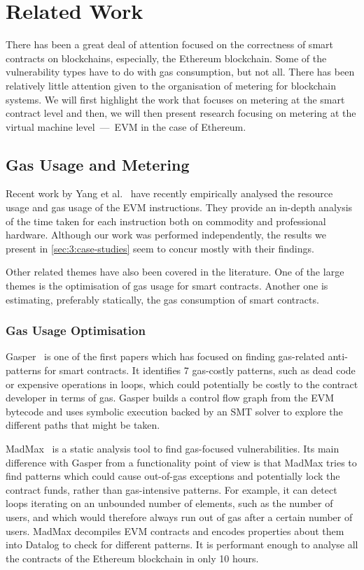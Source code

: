 \section{Related Work}
\label{sec:3:related}

There has been a great deal of attention focused on the correctness of smart contracts on blockchains, especially, the Ethereum blockchain. Some of the vulnerability types have to do with gas consumption, but not all. There has been relatively little attention given to the organisation of metering for blockchain systems. We will first highlight the work that focuses on metering at the smart contract level and then, we will then present research focusing on metering at the virtual machine level~---~EVM in the case of Ethereum.

\subsection{Gas Usage and Metering}
Recent work by Yang et al.~\cite{DBLP:journals/corr/abs-1905-00553} have recently empirically analysed the resource usage and gas usage of the EVM instructions.
They provide an in-depth analysis of the time taken for each instruction both on commodity and professional hardware. Although our work was performed independently, the results we present in \autoref{sec:3:case-studies} seem to concur mostly with their findings.

Other related themes have also been covered in the literature. One of the large themes is the optimisation of gas usage for smart contracts. Another one is estimating, preferably statically, the gas consumption of smart contracts.

\subsubsection*{Gas Usage Optimisation}
Gasper~\cite{Chen2017} is one of the first papers which has focused on finding gas-related anti-patterns for smart contracts. It identifies 7 gas-costly patterns, such as dead code or expensive operations in loops, which could potentially be costly to the contract developer in terms of gas. Gasper builds a control flow graph from the EVM bytecode and uses symbolic execution backed by an SMT solver to explore the different paths that might be taken.

MadMax~\cite{Grech2018} is a static analysis tool to find gas-focused vulnerabilities. Its main difference with Gasper from a functionality point of view is that MadMax tries to find patterns which could cause out-of-gas exceptions and potentially lock the contract funds, rather than gas-intensive patterns. For example, it can detect loops iterating on an unbounded number of elements, such as the number of users, and which would therefore always run out of gas after a certain number of users. MadMax decompiles EVM contracts and encodes properties about them into Datalog to check for different patterns. It is performant enough to analyse all the contracts of the Ethereum blockchain in only 10 hours.

